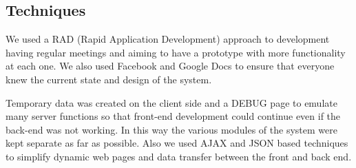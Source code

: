 \subsection{Techniques}
We used a RAD (Rapid Application Development) approach to development having regular meetings and aiming to have a prototype with more functionality at each one. We also used Facebook and Google Docs to ensure that everyone knew the current state and design of the system.

Temporary data was created on the client side and a DEBUG page to emulate many server functions so that front-end development could continue even if the back-end was not working. In this way the various modules of the system were kept separate as far as possible. Also we used AJAX and JSON based techniques to simplify dynamic web pages and data transfer between the front and back end.